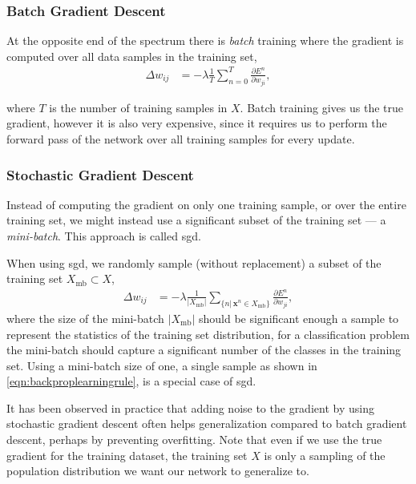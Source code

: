 \documentclass[thesis]{subfiles}
\begin{document}
\subsubsection{Batch Gradient Descent}
At the opposite end of the spectrum there is \emph{batch} training where the gradient is computed over all data samples in the training set,
\begin{equation}
\begin{aligned}
    \Delta w_{ij} &= -\lambda\frac{1}{T} \sum^T_{n=0} \frac{\partial E^n}{\partial w_{ji}},
     \label{eqn:batchlearningrule}
\end{aligned}
\end{equation}

where $T$ is the number of training samples in $X$. Batch training gives us the true gradient, however it is also very expensive, since it requires us to perform the forward pass of the network over all training samples for every update. 

\subsubsection{Stochastic Gradient Descent}
Instead of computing the gradient on only one training sample, or over the entire training set, we might instead use a significant subset of the training set --- a \emph{mini-batch}. This approach is called \gls{sgd}.

When using \gls{sgd}, we randomly sample (without replacement) a subset of the training set $X_{\textrm{mb}} \subset X$,
\begin{equation}
\begin{aligned}
    \Delta w_{ij} &= -\lambda \frac{1}{|X_{\textrm{mb}}|} \sum_{\{n|\,\mathbf{x}^n \in X_{\textrm{mb}}\}} \frac{\partial E^n}{\partial w_{ji}},
     \label{eqn:sgdrule}
\end{aligned}
\end{equation}
where the size of the mini-batch $|X_{\textrm{mb}}|$ should be significant enough a sample to represent the statistics of the training set distribution, \ie{}for a classification problem the mini-batch should capture a significant number of the classes in the training set. Using a mini-batch size of one, \ie{}a single sample as shown in \cref{eqn:backproplearningrule}, is a special case of \gls{sgd}. 

It has been observed in practice that adding noise to the gradient by using stochastic gradient descent often helps generalization compared to batch gradient descent, perhaps by preventing overfitting. Note that even if we use the true gradient for the training dataset, the training set $X$ is only a sampling of the population distribution we want our network to generalize to.
\end{document}
